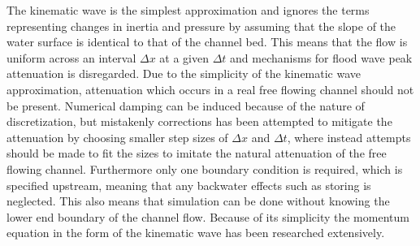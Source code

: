 The kinematic wave is the simplest approximation and ignores the terms representing changes in inertia and pressure by assuming that the slope of the water surface is identical to that of the channel bed. 
This means that the flow is uniform across an interval $\Delta x$ at a given $\Delta t$ and mechanisms for flood wave peak attenuation is disregarded. Due to the simplicity of the kinematic wave approximation, attenuation which occurs in a real free flowing channel should not be present. Numerical damping can be induced because of the nature of discretization, but mistakenly corrections has been attempted to mitigate the attenuation by choosing smaller step sizes of $\Delta x$ and $\Delta t$, where instead attempts should be made to fit the sizes to imitate the natural attenuation of the free flowing channel.     
Furthermore only one boundary condition is required, which is specified upstream, meaning that any backwater effects such as storing is neglected. This also means that simulation can be done without knowing the lower end boundary of the channel flow. Because of its simplicity the momentum equation in the form of the kinematic wave has been researched extensively\cite{stormwatercollectionsystems}.  












